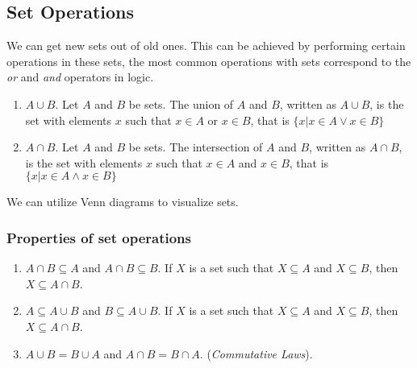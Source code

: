 \documentclass[11pt]{article}
\begin{document}
    \subsection{Set Operations}
        We can get new sets out of old ones. This can be achieved by performing certain operations in these sets, the most common operations with sets correspond to the \textit{or} and \textit{and} operators in logic.

        \begin{enumerate}
            \item $A \cup B$. Let $A$ and $B$ be sets. The union of $A$ and $B$, written as $A \cup B$, is the set with elements $x$ such that $x \in A$ or $x \in B$, that is $ \{ x | x \in A \vee x \in B \} $
            \item $A \cap B$. Let $A$ and $B$ be sets. The intersection of $A$ and $B$, written as $A \cap B$, is the set with elements $x$ such that $x \in A$ and $x \in B$, that is $ \{ x | x \in A \wedge x \in B \}$
        \end{enumerate}
        We can utilize Venn diagrams to visualize sets.

        \subsubsection{Properties of set operations}
            \begin{enumerate}
                \item $A \cap B \subseteq A$ and $A \cap B \subseteq B$. If $X$ is a set such that $X \subseteq A$ and $X \subseteq B$, then $X \subseteq A \cap B$.
                \item $A \subseteq A \cup B$ and $B \subseteq A \cup B$. If $X$ is a set such that $X \subseteq A$ and $X \subseteq B$, then $X \subseteq A \cap B$.
                \item $A \cup B = B \cup A$ and $A \cap B = B \cap A$. (\textit{Commutative Laws}).
            \end{enumerate}
\end{document}

